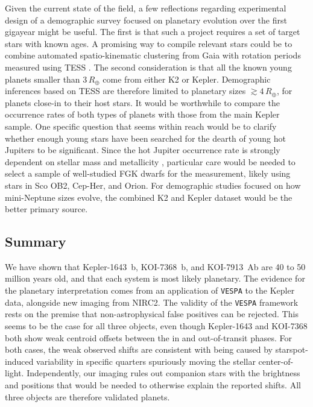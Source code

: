 \documentclass[12pt,twocolumn]{aastex63}
\begin{document}
Given the current state of the field, a few reflections regarding
experimental design of a demographic survey focused on planetary
evolution over the first gigayear might be useful.  The first is that
such a project requires a set of target stars with known ages.  A
promising way to compile relevant stars could be to combine automated
spatio-kinematic clustering from Gaia with rotation periods measured
using TESS \citep[see the appendices of][]{bouma_kep1627_2022}.  The
second consideration is that all the known young planets smaller than
$3$\,$R_\oplus$ come from either K2 or Kepler.  Demographic inferences
based on TESS are therefore limited to planetary sizes
$\gtrsim4$\,$R_\oplus$, for planets close-in to their host stars.  It
would be worthwhile to compare the occurrence rates of both types of
planets with those from the main Kepler sample.  One specific question
that seems within reach would be to clarify whether enough young stars
have been searched for the dearth of young hot Jupiters to be
significant.  Since the hot Jupiter occurrence rate is strongly
dependent on stellar mass and metallicity
\citep{petigura_metallicity_2018,petigura_cksX_2022}, particular care
would be needed to select a sample of well-studied FGK dwarfs for the
measurement, likely using stars in Sco OB2, Cep-Her, and Orion.  For
demographic studies focused on how mini-Neptune sizes evolve, the
combined K2 and Kepler dataset would be the better primary source.  



\subsection{Summary}

We have shown that Kepler-1643~b, KOI-7368~b, and KOI-7913~Ab are 40
to 50 million years old, and that each system is most likely
planetary.  The evidence for the planetary interpretation comes from
an application of \texttt{VESPA} to the Kepler data, alongside new
imaging from NIRC2.  The validity of the \texttt{VESPA} framework
rests on the premise that non-astrophysical false positives can be
rejected.  
This seems to be the case for all three objects, even though
Kepler-1643 and KOI-7368 
both show weak centroid offsets between the in
and out-of-transit phases.  For both cases, the weak observed shifts
are consistent with being caused by starspot-induced variability in
specific quarters spuriously moving the stellar center-of-light.
Independently, our imaging rules out companion stars with the
brightness and positions that would be needed to otherwise explain the
reported shifts.  All three objects are therefore validated planets.
\end{document}
